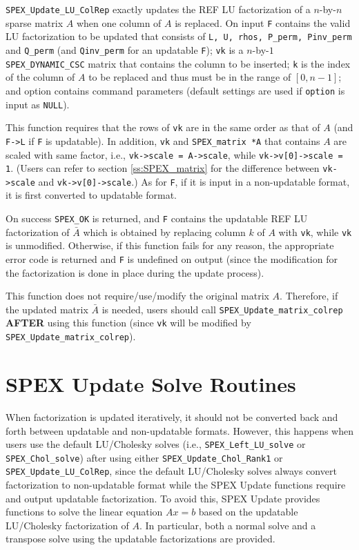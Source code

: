 \documentclass[12pt]{report}
\theoremstyle{definition}
\begin{document}
{\verb|SPEX_Update_LU_ColRep| exactly updates the REF LU factorization of a  $n$-by-$n$ sparse matrix $A$ when one column of $A$ is replaced. On input \verb|F| contains the valid LU factorization to be updated that consists of \verb|L, U, rhos, P_perm, Pinv_perm| and \verb|Q_perm| (and \verb|Qinv_perm| for an updatable \verb|F|); \verb|vk| is a $n$-by-$1$ \verb|SPEX_DYNAMIC_CSC| matrix that contains the column to be inserted; \verb|k| is the index of the column of $A$ to be replaced and thus must be in the range of $[0,n-1]$; and option contains command parameters (default settings are used if \verb|option| is input as \verb|NULL|).


This function requires that the rows of \verb|vk| are in the same order as that of $A$ (and \verb|F->L| if \verb|F| is updatable). In addition, \verb|vk| and \verb|SPEX_matrix *A| that contains $A$ are scaled with same factor, i.e., \verb|vk->scale = A->scale|, while \verb|vk->v[0]->scale = 1|. (Users can refer to section \ref{ss:SPEX_matrix} for the difference between \verb|vk->scale| and \verb|vk->v[0]->scale|.) As for \verb|F|, if it is input in a non-updatable format, it is first converted to updatable format.

On success \verb|SPEX_OK| is returned, and  \verb|F| contains the updatable REF LU factorization of $\bar{A}$ which is obtained by replacing column $k$ of $A$ with \verb|vk|, while \verb|vk| is unmodified.
Otherwise, if this function fails for any reason, the appropriate error code is returned and \verb|F| is undefined on output (since the modification for the factorization is done in place during the update process).

This function does not require/use/modify the original matrix $A$. Therefore, if the updated matrix $\bar{A}$ is needed, users should call \verb|SPEX_Update_matrix_colrep| {\bf AFTER} using this function (since \verb|vk| will be modified by \verb|SPEX_Update_matrix_colrep|). 


\section{SPEX Update Solve Routines}

When factorization is updated iteratively, it should not be converted back and forth between updatable and non-updatable formats. However, this happens when users use the default LU/Cholesky solves (i.e., \verb|SPEX_Left_LU_solve| or \verb|SPEX_Chol_solve|) after using either \verb|SPEX_Update_Chol_Rank1| or \verb|SPEX_Update_LU_ColRep|, since the default LU/Cholesky solves always convert factorization to non-updatable format while the SPEX Update functions require and output updatable factorization.  To avoid this, SPEX Update provides functions to solve the linear equation $Ax=b$ based on the updatable LU/Cholesky factorization of $A$. In particular, both a normal solve and a transpose solve using the updatable factorizations are provided.

}
\end{document}

